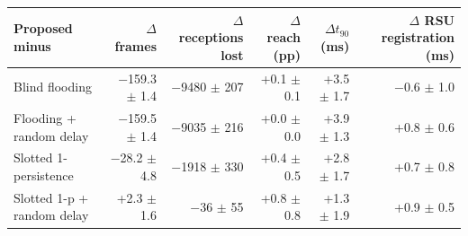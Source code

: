 \footnotesize
\renewcommand{\arraystretch}{1.2}
\begin{tabular}{lrrrrr}
\toprule
Proposed minus & $\Delta$ frames & $\Delta$ receptions lost & $\Delta$ reach (pp) & $\Delta t_{90}$ (ms) & $\Delta$ RSU registration (ms) \\
\midrule
Blind flooding & $-$159.3 $\pm$ 1.4 & $-$9480 $\pm$ 207 & +0.1 $\pm$ 0.1 & +3.5 $\pm$ 1.7 & $-$0.6 $\pm$ 1.0 \\
Flooding + random delay & $-$159.5 $\pm$ 1.4 & $-$9035 $\pm$ 216 & +0.0 $\pm$ 0.0 & +3.9 $\pm$ 1.3 & +0.8 $\pm$ 0.6 \\
Slotted 1-persistence & $-$28.2 $\pm$ 4.8 & $-$1918 $\pm$ 330 & +0.4 $\pm$ 0.5 & +2.8 $\pm$ 1.7 & +0.7 $\pm$ 0.8 \\
Slotted 1-p + random delay & +2.3 $\pm$ 1.6 & $-$36 $\pm$ 55 & +0.8 $\pm$ 0.8 & +1.3 $\pm$ 1.9 & +0.9 $\pm$ 0.5 \\
\bottomrule
\end{tabular}
